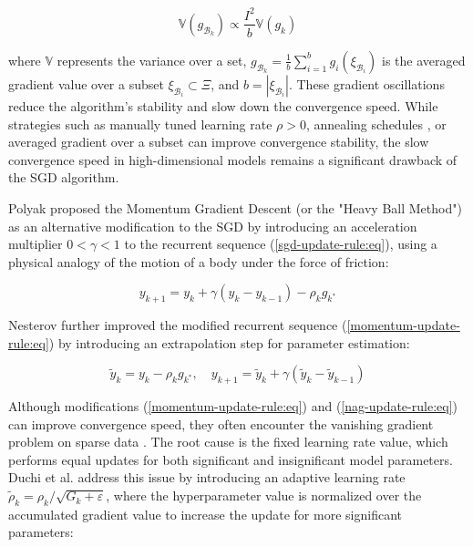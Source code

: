 \begin{equation}
    \label{sgd-oscillations:eq}
        \mathbb{V} (g_{\mathcal{B}_k}) \propto \frac{I^2}{b} \mathbb{V} (g_k)
\end{equation}

\noindent where $\mathbb{V}$ represents the variance over a set, $g_{\mathcal{B}_k} = \frac{1}{b} \sum_{i=1}^{b} g_i (\xi_{\mathcal{B}_i})$ is the averaged gradient value over a subset $\xi_{\mathcal{B}_i} \subset \Xi$, and $b = | \xi_{\mathcal{B}_i} |$. These gradient oscillations reduce the algorithm's stability and slow down the convergence speed. While strategies such as manually tuned learning rate $\rho > 0$, annealing schedules \cite{Robbins_Monro_1951}, or averaged gradient over a subset can improve convergence stability, the slow convergence speed in high-dimensional models \cite{Norkin_Kozyriev_Norkin_2024} remains a significant drawback of the SGD algorithm.

Polyak \cite{Poliak_1987} proposed the Momentum Gradient Descent (or the "Heavy Ball Method") as an alternative modification to the SGD by introducing an acceleration multiplier $0 < \gamma < 1$ to the recurrent sequence (\ref{sgd-update-rule:eq}), using a physical analogy of the motion of a body under the force of friction:

\begin{equation}
    \label{momentum-update-rule:eq}
        y_{k+1} = y_k + \gamma (y_k - y_{k-1}) - \rho_k g_{k^*}
\end{equation}

Nesterov \cite{nesterov1983method,walkington_2023} further improved the modified recurrent sequence (\ref{momentum-update-rule:eq}) by introducing an extrapolation step for parameter estimation:

\begin{equation}
    \label{nag-update-rule:eq}
        \tilde{y}_k = y_k - \rho_k g_{k^*}, \quad y_{k+1} = \tilde{y}_k + \gamma (\tilde{y}_k - \tilde{y}_{k-1})
\end{equation}

Although modifications (\ref{momentum-update-rule:eq}) and (\ref{nag-update-rule:eq}) can improve convergence speed, they often encounter the vanishing gradient problem on sparse data \cite{Bottou_Curtis_Nocedal_2018}. The root cause is the fixed learning rate value, which performs equal updates for both significant and insignificant model parameters. Duchi et al. \cite{Duchi_2011} address this issue by introducing an adaptive learning rate $\tilde{\rho}_k = \rho_k / \sqrt{G_k + \varepsilon}$, where the hyperparameter value is normalized over the accumulated gradient value to increase the update for more significant parameters:


